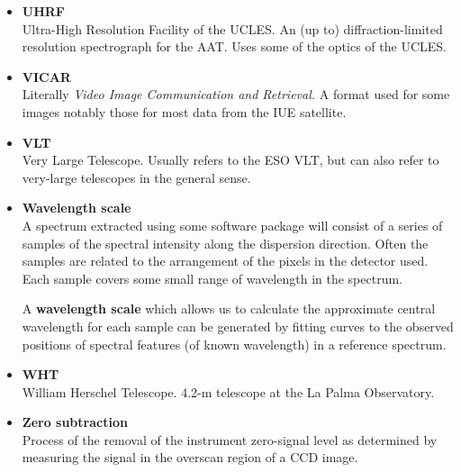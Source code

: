 \documentclass[twoside,11pt]{article}
\newcommand{\htmlref}[2]{#1}
\newcommand{\scspec}[2]{#1}
\newcommand{\scspec}[2]{#2}
\begin{document}
\begin{itemize}
\item {\bf\label{gl_uhrf}UHRF}\\
      Ultra-High Resolution Facility of the UCLES.  An (up to)
      diffraction-limited resolution spectrograph for the
      \htmlref{AAT}{aao_aat}\@.
      Uses some of the optics of the UCLES.

\item {\bf\label{gl_vicar}VICAR}\\
      Literally {\sl Video Image Communication and Retrieval.}
      A format used for some images notably those for most data
      from the \htmlref{IUE}{gl_iue} satellite.

\item {\bf\label{gl_vlt}VLT}\\
      Very Large Telescope.  Usually refers to the ESO VLT, but can
      also refer to very-large telescopes in the general sense.

\item {\bf\label{gl_wavelength}Wavelength scale}\\
      A spectrum extracted using some software package will consist
      of a series of samples of the spectral intensity along the
      dispersion direction.  Often the samples are related to the
      arrangement of the pixels in the detector used.  Each sample
      covers some small range of wavelength in the spectrum.

      A {\bf wavelength scale} which allows us to calculate the
      approximate central wavelength for each sample can be generated
      by fitting curves to the observed positions of spectral features
      (of known wavelength) in a reference spectrum.

\item {\bf\label{gl_wht}WHT}\\
      William Herschel Telescope.  4.2-m telescope
      at the La Palma Observatory.

\item {\bf\label{gl_zero_sub}Zero subtraction}\\
      Process of the removal of the instrument zero-signal level as
      determined by measuring the signal in the
      \htmlref{overscan region}{gl_overscan} of a CCD image.


\end{itemize}

\scspec{\normalsize}{ }
\end{document}
